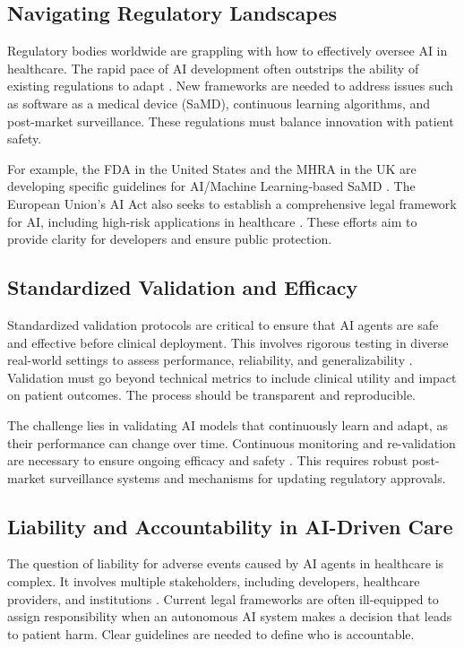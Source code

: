 \documentclass[12pt,a4paper]{article}
\begin{document}
\subsection{Navigating Regulatory Landscapes}
Regulatory bodies worldwide are grappling with how to effectively oversee AI in healthcare. The rapid pace of AI development often outstrips the ability of existing regulations to adapt \cite{fda_ai_ml_samd}. New frameworks are needed to address issues such as software as a medical device (SaMD), continuous learning algorithms, and post-market surveillance. These regulations must balance innovation with patient safety.

For example, the FDA in the United States and the MHRA in the UK are developing specific guidelines for AI/Machine Learning-based SaMD \cite{fda_ai_ml_samd, gov_uk_mhra_roadmap}. The European Union's AI Act also seeks to establish a comprehensive legal framework for AI, including high-risk applications in healthcare \cite{regdesk_eu_ai_act}. These efforts aim to provide clarity for developers and ensure public protection.

\subsection{Standardized Validation and Efficacy}
Standardized validation protocols are critical to ensure that AI agents are safe and effective before clinical deployment. This involves rigorous testing in diverse real-world settings to assess performance, reliability, and generalizability \cite{campanella2019deep}. Validation must go beyond technical metrics to include clinical utility and impact on patient outcomes. The process should be transparent and reproducible.

The challenge lies in validating AI models that continuously learn and adapt, as their performance can change over time. Continuous monitoring and re-validation are necessary to ensure ongoing efficacy and safety \cite{saito2015precision}. This requires robust post-market surveillance systems and mechanisms for updating regulatory approvals.

\subsection{Liability and Accountability in AI-Driven Care}
The question of liability for adverse events caused by AI agents in healthcare is complex. It involves multiple stakeholders, including developers, healthcare providers, and institutions \cite{duanemorris}. Current legal frameworks are often ill-equipped to assign responsibility when an autonomous AI system makes a decision that leads to patient harm. Clear guidelines are needed to define who is accountable.
\end{document}
